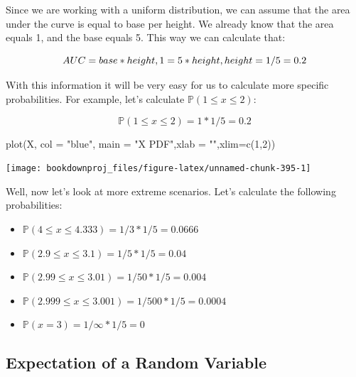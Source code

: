 \documentclass[
]{book}
\newenvironment{Shaded}{\begin{snugshade}}{\end{snugshade}}
\newcommand{\AttributeTok}[1]{\textcolor[rgb]{0.77,0.63,0.00}{#1}}
\newcommand{\DecValTok}[1]{\textcolor[rgb]{0.00,0.00,0.81}{#1}}
\newcommand{\FunctionTok}[1]{\textcolor[rgb]{0.00,0.00,0.00}{#1}}
\newcommand{\NormalTok}[1]{#1}
\newcommand{\StringTok}[1]{\textcolor[rgb]{0.31,0.60,0.02}{#1}}
\providecommand{\tightlist}{%
  \setlength{\itemsep}{0pt}\setlength{\parskip}{0pt}}
\theoremstyle{definition}
\theoremstyle{definition}
\theoremstyle{definition}
\theoremstyle{definition}
\theoremstyle{remark}
\begin{document}
Since we are working with a uniform distribution, we can assume that the area under the curve is equal to base per height. We already know that the area equals 1, and the base equals 5. This way we can calculate that:

\[
AUC = base*height, \\
1 = 5*height, \\
height = 1/5 = 0.2
\]

With this information it will be very easy for us to calculate more specific probabilities. For example, let's calculate \(\mathbb{P}(1 \leq x \leq 2)\):

\[
\mathbb{P}(1 \leq x \leq 2) = 1*1/5 = 0.2
\]

\begin{Shaded}
\begin{Highlighting}[]
\FunctionTok{plot}\NormalTok{(X, }\AttributeTok{col =} \StringTok{"blue"}\NormalTok{, }\AttributeTok{main =} \StringTok{"X PDF"}\NormalTok{,}\AttributeTok{xlab =} \StringTok{""}\NormalTok{,}\AttributeTok{xlim=}\FunctionTok{c}\NormalTok{(}\DecValTok{1}\NormalTok{,}\DecValTok{2}\NormalTok{))}
\end{Highlighting}
\end{Shaded}

\begin{center}\texttt{[image: bookdownproj\_files/figure-latex/unnamed-chunk-395-1]} \end{center}

Well, now let's look at more extreme scenarios. Let's calculate the following probabilities:

\begin{itemize}
\tightlist
\item
  \(\mathbb{P}(4 \leq x \leq 4.333) = 1/3 * 1/5 = 0.0666\)
\item
  \(\mathbb{P}(2.9 \leq x \leq 3.1) = 1/5 * 1/5 = 0.04\)
\item
  \(\mathbb{P}(2.99 \leq x \leq 3.01) = 1/50 * 1/5 = 0.004\)
\item
  \(\mathbb{P}(2.999 \leq x \leq 3.001) = 1/500 * 1/5 = 0.0004\)
\item
  \(\mathbb{P}(x=3) = 1/\infty * 1/5 = 0\)
\end{itemize}

\hypertarget{expectation-of-a-random-variable}{%
\subsection{Expectation of a Random Variable}\label{expectation-of-a-random-variable}}
\end{document}

